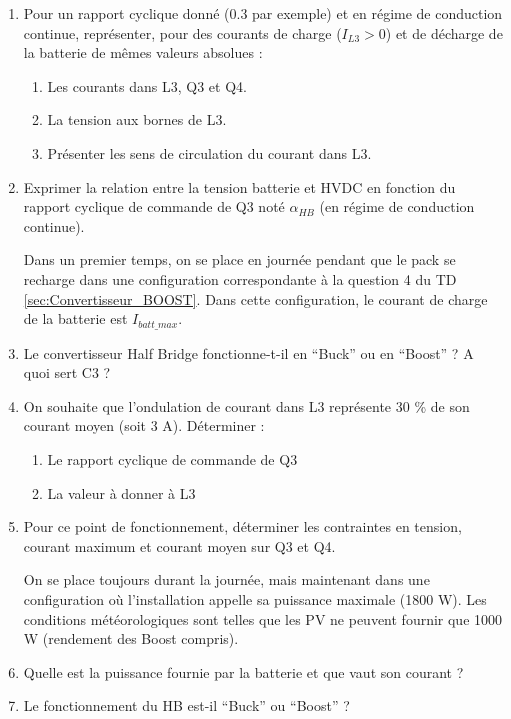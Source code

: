 \begin{enumerate}
\item Pour un rapport cyclique donné (0.3 par exemple) et en régime de conduction continue, représenter, pour des courants de charge ($I_{L3} > 0$) et de décharge de la batterie de mêmes valeurs absolues :
\begin{enumerate}
\item Les courants dans L3, Q3 et Q4.
\item La tension aux bornes de L3.
\item Présenter les sens de circulation du courant dans L3.
\end{enumerate}

\item Exprimer la relation entre la tension batterie et HVDC en fonction du rapport cyclique de commande de Q3 noté $\alpha_{HB}$ (en régime de conduction continue).

Dans un premier temps, on se place en journée pendant que le pack se recharge dans une configuration correspondante à la question 4 du TD \ref{sec:Convertisseur_BOOST}. Dans cette configuration, le courant de charge de la batterie est $I_{batt\_max}$.

\item Le convertisseur Half Bridge fonctionne-t-il en ``Buck'' ou en ``Boost'' ? A quoi sert C3 ?

\item On souhaite que l’ondulation de courant dans L3 représente 30 \% de son courant moyen (soit 3 A). Déterminer :

\begin{enumerate}
\item Le rapport cyclique de commande de Q3
\item La valeur à donner à L3
\end{enumerate}

\item Pour ce point de fonctionnement, déterminer les contraintes en tension, courant maximum et courant moyen sur Q3 et Q4.

On se place toujours durant la journée, mais maintenant dans une configuration où l’installation appelle sa puissance maximale (1800 W). Les conditions météorologiques sont telles que les PV ne peuvent fournir que 1000 W (rendement des Boost compris).

\item Quelle est la puissance fournie par la batterie et que vaut son courant ?

\item Le fonctionnement du HB est-il ``Buck'' ou ``Boost'' ?


\end{enumerate}
